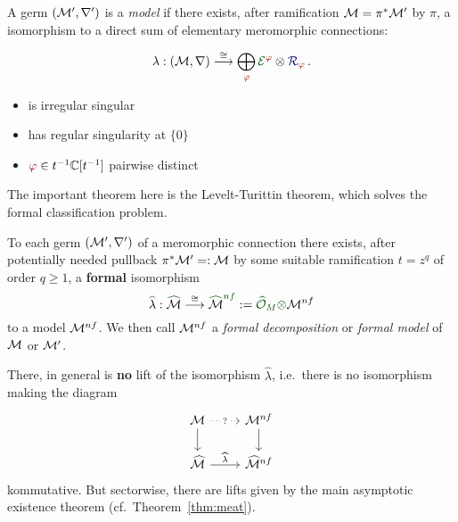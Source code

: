 \begin{defn}\label{defn:model}
  \def\myPhi{\textcolor{red!60!black}{\phi}}
  \def\myE{\textcolor{green!40!black}{\cE^{\myPhi}}}
  A germ $(\mathcal{M}',\nabla')$ is a \emph{model} if there exists, after ramification
  $\mathcal{M}=\pi^*\mathcal{M}'$ by $\pi$, a isomorphism to a direct sum of elementary
  meromorphic connections:
  \begin{multicols}{2}
    \[
      \lambda:(\cM,\nabla)
      \overset{\cong}{\longrightarrow}
      \bigoplus_{~\tikzmark{e3}\!\!\myPhi}
      \overset{\tikzmark{e2}}{\myE}
      \otimes
      \overset{\tikzmark{e1}}{\textcolor{blue!40!black}{\cR_{\myPhi}}}
      \,.
    \]
    \columnbreak{}
    \begin{itemize}
      \item[\tikzmarkb{n2}{green}] is irregular singular
      \item[\tikzmarkc{n1}{blue}] has regular singularity at $\{0\}$
      \item[\tikzmarkc{n3}{red}] $\myPhi\in t^{-1}\C[t^{-1}]$ pairwise distinct
    \end{itemize}
  \end{multicols}

\end{defn}
The important theorem here is the Levelt-Turittin theorem, which solves the
formal classification problem.
\begin{thm}\label{thm:leveltTurittin}
  To each germ $(\mathcal{M}',\nabla')$ of a meromorphic connection there exists, after
  potentially needed pullback $\pi^{*}\textcolor{black}{\mathcal{M}'}=:\mathcal{M}$ by some
  suitable ramification $t=z^q$ of order $q\geq1$, a
  \textcolor{green!30!black}{\textbf{formal}} isomorphism
  \[
    \textcolor{green!30!black}{\hat{\textcolor{black}{\lambda}}}:
    \textcolor{green!30!black}{\hat{\textcolor{black}{\cM}}}
    \overset{\cong}\longrightarrow
    \textcolor{green!30!black}{\hat{\textcolor{black}{\cM}}^{nf}}
    :=\textcolor{green!30!black}{\hat\cO_M\otimes}\cM^{nf}
  \]
  to a model $\mathcal{M}^{nf}$.
  We then call $\mathcal{M}^{nf}$ a \emph{formal decomposition} or \emph{formal model}
  of $\mathcal{M}$ or $\mathcal{M}'$.
  \begin{rem}
    There, in general is \textbf{no} lift of the isomorphism $\hat\lambda$,
    i.e.\ there is no isomorphism making the diagram
    \[ \begin{tikzcd}
        \cM \dar \arrow[dotted]{r}[description]{?} & \cM^{nf} \dar
        \\\hat\cM \rar{\hat\lambda} & \hat\cM^{nf}
    \end{tikzcd} \]
    kommutative.
    But sectorwise, there are lifts given by the main asymptotic existence
    theorem (cf.\ Theorem~\ref{thm:meat}).
  \end{rem}
\end{thm}
